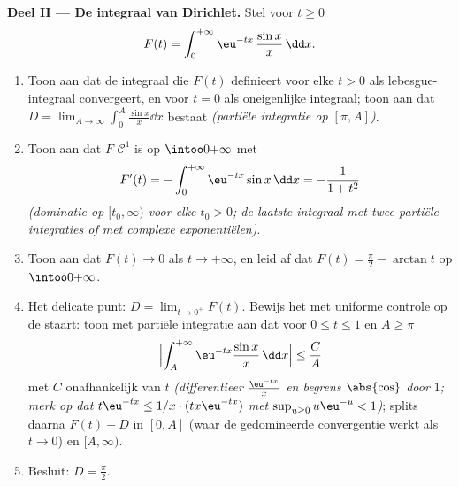 \begin{problem}
\medskip
\noindent\textbf{Deel II --- De integraal van Dirichlet.} Stel
voor $t \geq 0$
\[
F(t) = \int_0^{+\infty}\eu^{-tx}\,\frac{\sin x}{x}\,\dd x .
\]
\begin{enumerate}[resume]
  \item Toon aan dat de integraal die $F(t)$ definieert voor elke
        $t > 0$ als lebesgue-integraal convergeert, en voor $t =
        0$ als oneigenlijke integraal; toon aan dat $D =
        \lim_{A\to\infty}\int_0^A\frac{\sin x}x\dd x$ bestaat
        \emph{(partiële integratie op $[\pi, A]$)}.
  \item Toon aan dat $F$ $\mathcal C^1$ is op $\intoo0{+\infty}$
        met
        \[
        F'(t) = -\int_0^{+\infty}\eu^{-tx}\sin x\,\dd x
        = -\frac{1}{1 + t^2}
        \]
        \emph{(dominatie op $[t_0, \infty)$ voor elke $t_0 > 0$;
        de laatste integraal met twee partiële integraties of met
        complexe exponentiëlen)}.
  \item Toon aan dat $F(t) \to 0$ als $t \to +\infty$, en leid af
        dat $F(t) = \frac\pi2 - \arctan t$ op $\intoo0{+\infty}$.
  \item Het delicate punt: $D = \lim_{t\to0^+}F(t)$. Bewijs het
        met uniforme controle op de staart: toon met partiële
        integratie aan dat voor $0 \leq t \leq 1$ en $A \geq \pi$
        \[
        \Bigl|\int_A^{+\infty}\eu^{-tx}\frac{\sin
        x}x\,\dd x\Bigr| \leq \frac{C}{A}
        \]
        met $C$ onafhankelijk van $t$ \emph{(differentieer
        $\frac{\eu^{-tx}}x$ en begrens $\abs{\cos}$ door $1$; merk
        op dat $t\eu^{-tx} \leq 1/x\cdot(tx\eu^{-tx})$ met
        $\sup_{u\geq0}u\eu^{-u} < 1$)}; splits daarna $F(t) - D$
        in $[0, A]$ (waar de gedomineerde convergentie werkt als
        $t \to 0$) en $[A, \infty)$.
  \item Besluit: $D = \frac\pi2$.
\end{enumerate}


\end{problem}
